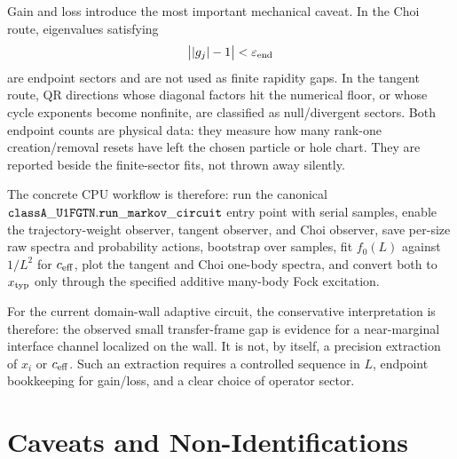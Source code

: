 \documentclass[aps,prb,onecolumn,nofootinbib,superscriptaddress]{revtex4-2}
\theoremstyle{plain}
\theoremstyle{definition}
\begin{document}
Gain and loss introduce the most important mechanical caveat.  In the Choi
route, eigenvalues satisfying
\begin{equation}
  \bigl||g_j|-1\bigr|<\varepsilon_{\rm end}
  \label{eq:cpu-endpoint-test}
\end{equation}
are endpoint sectors and are not used as finite rapidity gaps.  In the tangent
route, QR directions whose diagonal factors hit the numerical floor, or whose
cycle exponents become nonfinite, are classified as null/divergent sectors.
Both endpoint counts are physical data: they measure how many rank-one
creation/removal resets have left the chosen particle or hole chart.  They are
reported beside the finite-sector fits, not thrown away silently.

The concrete CPU workflow is therefore: run the canonical
\({\tt classA\_U1FGTN.run\_markov\_circuit}\) entry point with serial samples,
enable the trajectory-weight observer, tangent observer, and Choi observer,
save per-size raw spectra and probability actions, bootstrap over samples,
fit \(f_0(L)\) against \(1/L^2\) for \(c_{\rm eff}\), plot the tangent
and Choi one-body spectra, and convert both to \(x_{\rm typ}\) only through
the specified additive many-body Fock excitation.

For the current domain-wall adaptive circuit, the conservative interpretation
is therefore: the observed small transfer-frame gap is evidence for a
near-marginal interface channel localized on the wall.  It is not, by itself,
a precision extraction of \(x_i\) or \(c_{\rm eff}\).  Such an extraction
requires a controlled sequence in \(L\), endpoint bookkeeping for gain/loss,
and a clear choice of operator sector.

\section{Caveats and Non-Identifications}
\label{sec:caveats}
\end{document}
